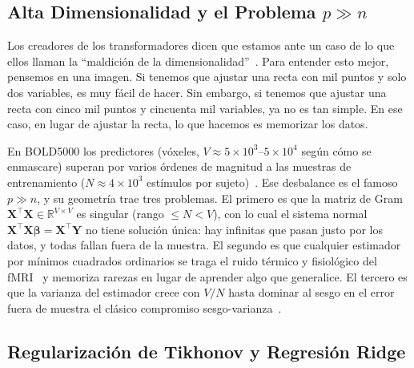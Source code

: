 \subsection{Alta Dimensionalidad y el Problema $p \gg n$}

Los creadores de los transformadores dicen que estamos ante un caso de lo que ellos llaman la ``maldición de la dimensionalidad''~\cite{hastie2009elements}. Para entender esto mejor, pensemos en una imagen.
Si tenemos que ajustar una recta con mil puntos y solo dos variables, es muy fácil de hacer. Sin embargo, si tenemos que ajustar una recta con cinco mil puntos y cincuenta mil variables, ya no es tan simple. En ese caso, en lugar de ajustar la recta, lo que hacemos es memorizar los datos.

En BOLD5000 los predictores (vóxeles, $V \approx 5\!\times\!10^{3}$--$5\!\times\!10^{4}$ según 
cómo se enmascare) superan por varios órdenes de magnitud a las muestras de entrenamiento 
($N \approx 4\!\times\!10^{3}$ estímulos por sujeto)~\cite{chang2019bold5000}. 
Ese desbalance es el famoso $p \gg n$, y su geometría trae tres problemas. El primero 
es que la matriz de Gram $\mathbf{X}^\top\mathbf{X}\in\mathbb{R}^{V\times V}$ es singular 
(rango $\leq N < V$), con lo cual el sistema normal $\mathbf{X}^\top\mathbf{X}\boldsymbol{\beta} = \mathbf{X}^\top\mathbf{Y}$ 
no tiene solución única: hay infinitas que pasan justo por los datos, y todas fallan fuera de 
la muestra. El segundo es que cualquier estimador por mínimos cuadrados ordinarios se traga el 
ruido térmico y fisiológico del fMRI~\cite{logothetis2008what} y memoriza rarezas en lugar de 
aprender algo que generalice. El tercero es que la varianza del estimador crece con $V/N$ hasta 
dominar al sesgo en el error fuera de muestra el clásico compromiso sesgo-varianza~\cite{hastie2009elements}.

\subsection{Regularización de Tikhonov y Regresión Ridge}

